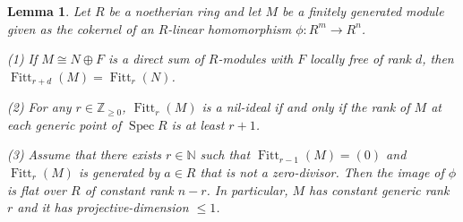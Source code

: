 \documentclass[12pt]{article}
\newtheorem{lemma}[theorem]{Lemma}
\theoremstyle{definition}
\numberwithin{equation}{theorem}
\newcommand{\NN}{\mathbb{N}}
\newcommand{\ZZ}{\mathbb{Z}}
\DeclareMathOperator{\Fitt}{Fitt}
\DeclareMathOperator{\Spec}{Spec}
\begin{document}
\begin{lemma}
\label{L:linear algebra}
Let $R$ be a noetherian ring and let $M$ be a finitely generated module given as the cokernel of an $R$-linear homomorphism
 $\phi: R^m \to R^n$.

(1)
If $M \cong N \oplus F$ is a direct sum of $R$-modules with $F$ locally free of rank $d$, then $\Fitt_{r+d}(M) = \Fitt_r(N)$.

(2)
For any $r \in \ZZ_{\geq 0}$, $\Fitt_r(M)$ is a nil-ideal if and only if the rank of $M$ at each generic point of $\Spec R$ is at least $r+1$.

(3)
Assume that there exists $r \in \NN$ such that $\Fitt_{r-1}(M) = (0)$
and $\Fitt_r(M)$ is generated by $a \in R$ that is not a zero-divisor.
Then the image of $\phi$ is flat over $R$ of constant rank $n-r$.  In particular, $M$ has constant generic rank $r$ and it has projective-dimension $\leq 1$.

\end{lemma}
\end{document}
